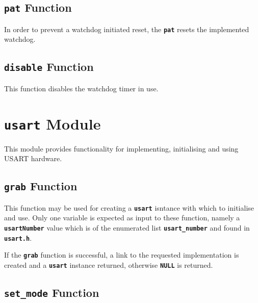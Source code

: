 \documentclass[a4paper, oneside, 11pt, titlepage, onecolumn, openright]{report}
\begin{document}
				\subsection{\textbf{\texttt{pat}} Function}
					\label{ss:Hardware Abstraction Libraries:watchdog Module:pat Function}
			
					In order to prevent a watchdog initiated reset, the {\textbf{\texttt{pat}}} resets the implemented watchdog.
			
				\subsection{\textbf{\texttt{disable}} Function}
					\label{ss:Hardware Abstraction Libraries:watchdog Module:disable Function}
			
					This function disables the watchdog timer in use.
			
			\section{\textbf{\texttt{usart}} Module}
				\label{s:Hardware Abstraction Libraries:usart Module}
			
				This module provides functionality for implementing, initialising and using USART hardware.
			
				\subsection{\textbf{\texttt{grab}} Function}
					\label{ss:Hardware Abstraction Libraries:usart Module:grab Function}
			
					This function may be used for creating a \textbf{\texttt{usart}} isntance with which to initialise and use. Only one variable is expected as input to these function, namely a \textbf{\texttt{usartNumber}} value which is of the enumerated list \textbf{\texttt{usart\_number}} and found in \textbf{\texttt{usart.h}}.
						
If the \textbf{\texttt{grab}} function is successful, a link to the requested implementation is created and a \textbf{\texttt{usart}} instance returned, otherwise \textbf{\texttt{NULL}} is returned.
			
				\subsection{\textbf{\texttt{set\_mode}} Function}
					\label{ss:Hardware Abstraction Libraries:usart Module:set_modeFunction}	
			
\end{document}
